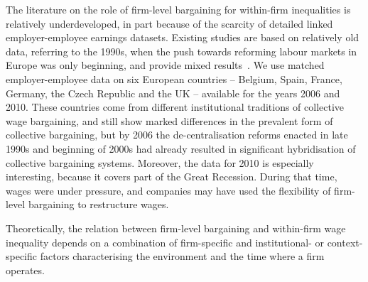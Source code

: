 \documentclass[12pt]{article}
\begin{document}
The literature on the role of firm-level bargaining for within-firm inequalities is relatively underdeveloped, in part because of the scarcity of detailed linked employer-employee earnings datasets. Existing studies are based on relatively old data, referring to the 1990s, when the push towards reforming labour markets in Europe was only beginning, and provide mixed results~\citep{dellaringa.lucifora.1994,dellaringa.lucifora.ea.2004, canaldominguez.gutierrez.2004}.
We use matched employer-employee data on six European countries -- Belgium, Spain, France, Germany, the Czech Republic and the UK -- available for the years 2006 and 2010. These countries come from different institutional traditions of collective wage bargaining, and still show marked differences in the prevalent form of collective bargaining, but by 2006 the de-centralisation reforms enacted in late 1990s and beginning of 2000s had already resulted in significant hybridisation of collective bargaining systems. Moreover, the data for 2010 is especially interesting, because it covers part of the Great Recession. During that time, wages were under pressure, and companies may have used the flexibility of firm-level bargaining to restructure wages.

Theoretically, the relation between firm-level bargaining and within-firm wage inequality depends on a combination of firm-specific and institutional- or context-specific factors characterising the environment and the time where a firm operates. 
\end{document}
